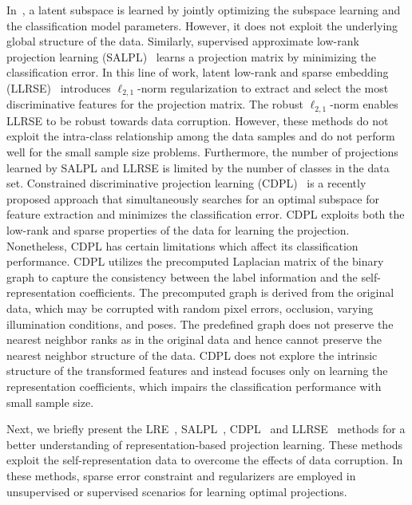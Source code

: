 In~\cite{RLSL}, a latent subspace is learned by jointly optimizing the subspace learning and the classification model parameters. However, it does not exploit the underlying global structure of the data. Similarly, supervised approximate low-rank projection learning (SALPL)~\cite{SALPL} learns a projection matrix by minimizing the classification error. In this line of work, latent low-rank and sparse embedding (LLRSE)~\cite{LLRSE} introduces $\ell_{2,1}$-norm regularization to extract and select the most discriminative features for the projection matrix. The robust $\ell_{2,1}$-norm enables LLRSE to be robust towards data corruption. However, these methods do not exploit the intra-class relationship among the data samples and do not perform well for the small sample size problems. Furthermore, the number of projections learned by SALPL and LLRSE is limited by the number of classes in the data set.
Constrained discriminative projection learning (CDPL)~\cite{CDPL} is a recently proposed approach that simultaneously searches for an optimal subspace for feature extraction and minimizes the classification error. CDPL exploits both the low-rank and sparse properties of the data for learning the projection. Nonetheless, CDPL has certain limitations which affect its classification performance. CDPL utilizes the precomputed Laplacian matrix of the binary graph to capture the consistency between the label information and the self-representation coefficients. The precomputed graph is derived from the original data, which may be corrupted with random pixel errors, occlusion, varying illumination conditions, and poses. The predefined graph does not preserve the nearest neighbor ranks as in the original data and hence cannot preserve the nearest neighbor structure of the data. CDPL does not explore the intrinsic structure of the transformed features and instead focuses only on learning the %
representation coefficients, which impairs the classification performance with small sample size.

Next, we briefly present the LRE~\cite{LRE}, SALPL~\cite{SALPL}, CDPL~\cite{CDPL} and LLRSE~\cite{LLRSE} methods for a better understanding of representation-based projection learning. These methods exploit the self-representation data to overcome the effects of data corruption. In these methods, sparse error constraint and regularizers are employed in unsupervised or supervised scenarios for learning optimal projections. 


